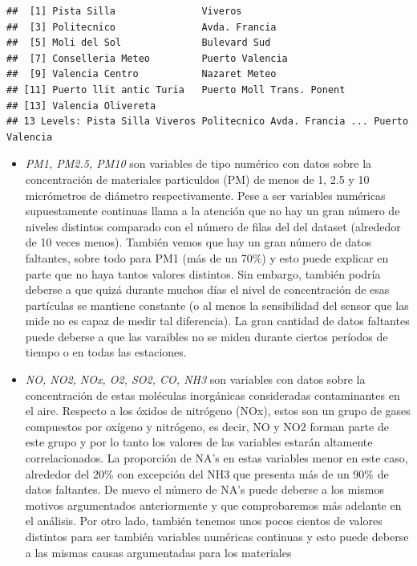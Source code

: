 \documentclass[notspecified,article,submit,moreauthors,pdftex]{Definitions/mdpi}
\begin{document}
\begin{verbatim}
##  [1] Pista Silla               Viveros                  
##  [3] Politecnico               Avda. Francia            
##  [5] Moli del Sol              Bulevard Sud             
##  [7] Conselleria Meteo         Puerto Valencia          
##  [9] Valencia Centro           Nazaret Meteo            
## [11] Puerto llit antic Turia   Puerto Moll Trans. Ponent
## [13] Valencia Olivereta       
## 13 Levels: Pista Silla Viveros Politecnico Avda. Francia ... Puerto Valencia
\end{verbatim}

\begin{itemize}
\item
  \emph{PM1, PM2.5, PM10} son variables de tipo numérico con datos sobre
  la concentración de materiales particuldos (PM) de menos de 1, 2.5 y
  10 micrómetros de diámetro respectivamente. Pese a ser variables
  numéricas supuestamente continuas llama a la atención que no hay un
  gran número de niveles distintos comparado con el número de filas del
  del dataset (alrededor de 10 veces menos). También vemos que hay un
  gran número de datos faltantes, sobre todo para PM1 (más de un 70\%) y
  esto puede explicar en parte que no haya tantos valores distintos. Sin
  embargo, también podría deberse a que quizá durante muchos días el
  nivel de concentración de esas partículas se mantiene constante (o al
  menos la sensibilidad del sensor que las mide no es capaz de medir tal
  diferencia). La gran cantidad de datos faltantes puede deberse a que
  las varaibles no se miden durante ciertos períodos de tiempo o en
  todas las estaciones.
\item
  \emph{NO, NO2, NOx, O2, SO2, CO, NH3} son variables con datos sobre la
  concentración de estas moléculas inorgánicas consideradas
  contaminantes en el aire. Respecto a los óxidos de nitrógeno (NOx),
  estos son un grupo de gases compuestos por oxígeno y nitrógeno, es
  decir, NO y NO2 forman parte de este grupo y por lo tanto los valores
  de las variables estarán altamente correlacionados. La proporción de
  NA's en estas variables menor en este caso, alrededor del 20\% con
  excepción del NH3 que presenta más de un 90\% de datos faltantes. De
  nuevo el número de NA's puede deberse a los mismos motivos
  argumentados anteriormente y que comprobaremos más adelante en el
  análisis. Por otro lado, también tenemos unos pocos cientos de valores
  distintos para ser también variables numéricas continuas y esto puede
  deberse a las mismas causas argumentadas para los materiales

\end{itemize}
\end{document}
